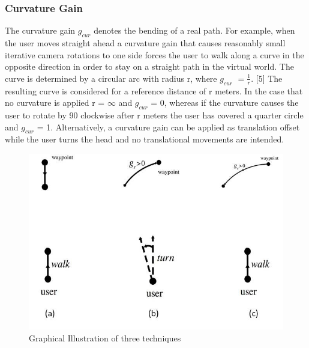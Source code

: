 \documentclass[12pt]{article}
\begin{document}
\subsubsection{Curvature Gain}
The curvature gain $g_{cur}$ denotes the bending of a real path. For example, when the user moves straight ahead a curvature gain that causes reasonably small iterative camera rotations to one side forces the user to walk along a curve in the opposite direction in order to stay on a straight path in the virtual world. The curve is determined by a circular arc with radius r, where $g_{cur}$ $= \frac{1}{r}$. [5] The resulting curve is considered for a reference distance of r meters. In the case that no curvature is applied r = $\infty $ and $g_{cur}$ = 0, whereas if the curvature causes the user to rotate by 90 clockwise after r meters the user has covered a quarter circle and $g_{cur}$ = 1. Alternatively, a curvature gain can be applied as translation offset while the user turns the head and no translational movements are intended.
\begin{figure}[!ht]
\centering
\includegraphics[width = 0.7 \textwidth]{Techs}
\caption{Graphical Illustration of three techniques}
\end{figure} \\
\end{document}
